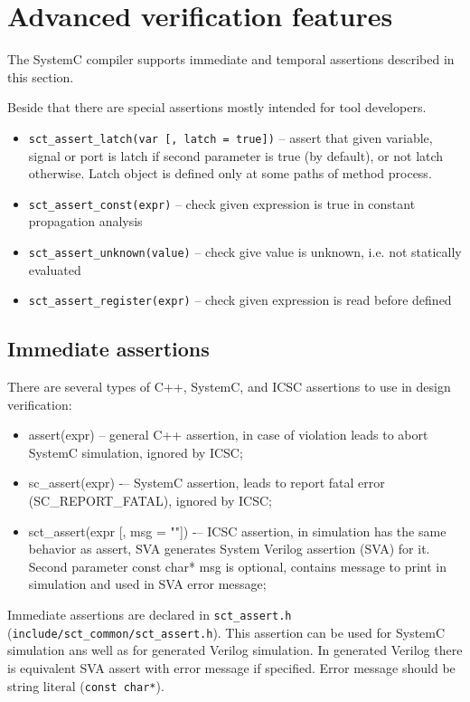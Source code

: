 \section{Advanced verification features}\label{section:assertions}

The SystemC compiler supports immediate and temporal assertions described in this section.

Beside that there are special assertions mostly intended for tool developers.
\begin{itemize}
\item {\tt sct\_assert\_latch(var [, latch = true])} -- assert that given variable, signal or port is latch if second parameter is true (by default), or not latch otherwise. Latch object is defined only at some paths of method process.
\item {\tt sct\_assert\_const(expr)} -- check given expression is true in constant propagation analysis
\item {\tt sct\_assert\_unknown(value)} -- check give value is unknown, i.e. not statically evaluated
\item {\tt sct\_assert\_register(expr)} -- check given expression is read before defined 
\end{itemize}


\subsection{Immediate assertions}

There are several types of C++, SystemC, and ICSC assertions to use in design verification:

\begin{itemize}
\item assert(expr) -- general C++ assertion, in case of violation leads to abort SystemC simulation, ignored by ICSC;
\item sc\_assert(expr) -– SystemC assertion, leads to report fatal error (SC\_REPORT\_FATAL), ignored by ICSC;
\item sct\_assert(expr [, msg = ""]) -– ICSC assertion, in simulation has the same behavior as assert, SVA generates System Verilog assertion (SVA) for it. Second parameter const char* msg is optional, contains message to print in simulation and used in SVA error message;
\end{itemize}

Immediate assertions are declared in {\tt sct\_assert.h} ({\tt include/sct\_common/sct\_assert.h}). This assertion can be used for SystemC simulation ans well as for generated Verilog simulation. In generated Verilog there is equivalent SVA assert with error message if specified. Error message should be string literal ({\tt const char*}).

